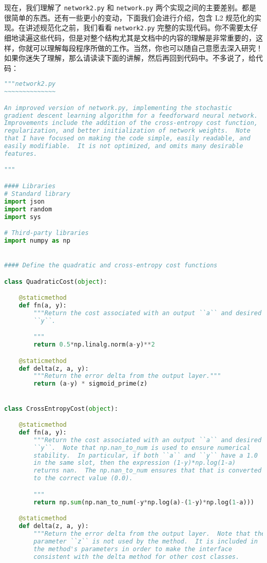 现在，我们理解了 \lstinline!network2.py! 和 \lstinline!network.py! 两个实现之间的主要差别。都是很简单的东西。还有一些更小的变动，下面我们会进行介绍，包含 L2 规范化的实现。在讲述规范化之前，我们看看 \lstinline!network2.py! 完整的实现代码。你不需要太仔细地读遍这些代码，但是对整个结构尤其是文档中的内容的理解是非常重要的，这样，你就可以理解每段程序所做的工作。当然，你也可以随自己意愿去深入研究！如果你迷失了理解，那么请读读下面的讲解，然后再回到代码中。不多说了，给代码：
\begin{lstlisting}[language=Python]
"""network2.py
~~~~~~~~~~~~~~

An improved version of network.py, implementing the stochastic
gradient descent learning algorithm for a feedforward neural network.
Improvements include the addition of the cross-entropy cost function,
regularization, and better initialization of network weights.  Note
that I have focused on making the code simple, easily readable, and
easily modifiable.  It is not optimized, and omits many desirable
features.

"""

#### Libraries
# Standard library
import json
import random
import sys

# Third-party libraries
import numpy as np


#### Define the quadratic and cross-entropy cost functions

class QuadraticCost(object):

    @staticmethod
    def fn(a, y):
        """Return the cost associated with an output ``a`` and desired output
        ``y``.

        """
        return 0.5*np.linalg.norm(a-y)**2

    @staticmethod
    def delta(z, a, y):
        """Return the error delta from the output layer."""
        return (a-y) * sigmoid_prime(z)


class CrossEntropyCost(object):

    @staticmethod
    def fn(a, y):
        """Return the cost associated with an output ``a`` and desired output
        ``y``.  Note that np.nan_to_num is used to ensure numerical
        stability.  In particular, if both ``a`` and ``y`` have a 1.0
        in the same slot, then the expression (1-y)*np.log(1-a)
        returns nan.  The np.nan_to_num ensures that that is converted
        to the correct value (0.0).

        """
        return np.sum(np.nan_to_num(-y*np.log(a)-(1-y)*np.log(1-a)))

    @staticmethod
    def delta(z, a, y):
        """Return the error delta from the output layer.  Note that the
        parameter ``z`` is not used by the method.  It is included in
        the method's parameters in order to make the interface
        consistent with the delta method for other cost classes.


\end{lstlisting}

